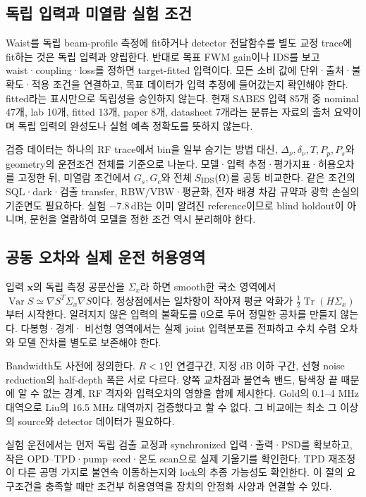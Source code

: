 \documentclass[11pt,a4paper]{article}
\newcommand{\dB}{\,\mathrm{dB}}
\begin{document}
\subsection{독립 입력과 미열람 실험 조건}
Waist를 독립 beam-profile 측정에 fit하거나 detector 전달함수를 별도
교정 trace에 fit하는 것은 독립 입력과 양립한다. 반대로 목표 FWM gain이나
IDS를 보고 waist·coupling·loss를 정하면 target-fitted 입력이다.
모든 소비 값에 단위·출처·불확도·적용 조건을 연결하고, 목표 데이터가
입력 추정에 들어갔는지 확인해야 한다. fitted라는 표시만으로 독립성을
승인하지 않는다. 현재 SABES 입력 85개 중 nominal 47개, lab 10개,
fitted 13개, paper 8개, datasheet 7개라는 분류는 자료의 출처 요약이며
독립 입력의 완성도나 실험 예측 정확도를 뜻하지 않는다.

검증 데이터는 하나의 RF trace에서 bin을 일부 숨기는 방법 대신,
$\Delta_\nu,\delta_\nu,T,P_p,P_s$와 geometry의 운전조건 전체를
기준으로 나눈다. 모델·입력 추정·평가지표·허용오차를 고정한 뒤,
미열람 조건에서 $G_s,G_c$와 전체 $S_{\rm IDS}(\Omega)$를 공동 비교한다.
같은 조건의 SQL·dark·검출 transfer, RBW/VBW·평균화, 전자 배경 차감 규약과
광학 손실의 기준면도 필요하다. 실험 $-7.8\dB$는 이미 알려진 reference이므로
blind holdout이 아니며, 문헌을 열람하여 모델을 정한 조건 역시 분리해야 한다.

\subsection{공동 오차와 실제 운전 허용영역}
입력 $\bm x$의 독립 측정 공분산을 $\Sigma_x$라 하면 smooth한 국소
영역에서 $\operatorname{Var}S\simeq\nabla S^T\Sigma_x\nabla S$이다.
정상점에서는 일차항이 작아져 평균 악화가
$\tfrac12\operatorname{Tr}(H\Sigma_x)$부터 시작한다. 알려지지 않은
입력의 불확도를 0으로 두어 정밀한 공차를 만들지 않는다. 다봉형·경계·
비선형 영역에서는 실제 joint 입력분포를 전파하고 수치 수렴 오차와
모델 잔차를 별도로 보존해야 한다.

Bandwidth도 사전에 정의한다. $R<1$인 연결구간, 지정 dB 이하 구간,
선형 noise reduction의 half-depth 폭은 서로 다르다. 양쪽 교차점과
불연속 밴드, 탐색창 끝 때문에 알 수 없는 경계, RF 격자와 입력오차의
영향을 함께 제시한다. Gold의 0.1--4 MHz 대역으로 Liu의 16.5 MHz
대역까지 검증했다고 할 수 없다. 그 비교에는 최소 그 이상의 source와
detector 데이터가 필요하다.

실험 운전에서는 먼저 독립 검출 교정과 synchronized 입력·출력·PSD를
확보하고, 작은 OPD--TPD·pump--seed·온도 scan으로 실제 기울기를 확인한다.
TPD 재조정이 다른 공명 가지로 불연속 이동하는지와 lock의 추종 가능성도
확인한다. 이 절의 요구조건을 충족할 때만 조건부 허용영역을 장치의
안정화 사양과 연결할 수 있다.
\end{document}
